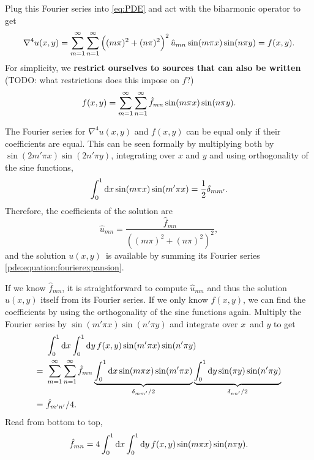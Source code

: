 Plug this Fourier series into \cref{eq:PDE} and act with the biharmonic operator to get
\begin{equation*}
\nabla^4 u(x,y) = \sum_{m=1}^{\infty} \sum_{n=1}^{\infty} \left((m\pi)^2+(n\pi)^2\right)^2 \hat{u}_{mn} \sin(m \pi x) \sin(n \pi y) = f(x,y).
\end{equation*}
For simplicity, we \textbf{restrict ourselves to sources that can also be written} (TODO: what restrictions does this impose on $f$?)
\begin{equation}
	f(x,y) = \sum_{m=1}^{\infty} \sum_{n=1}^{\infty} \hat{f}_{mn} \sin(m \pi x) \sin(n \pi y).
\end{equation}

The Fourier series for $\nabla^4 u(x,y)$ and $f(x,y)$ can be equal only if their coefficients are equal.
This can be seen formally by multiplying both by $\sin(2m'\pi x) \sin(2n'\pi y)$, integrating over $x$ and $y$ and using orthogonality of the sine functions,
\begin{equation*}
	\integral{\sin(m\pi x) \sin(m' \pi x)}{x}{0}{1} = \frac{1}{2} \delta_{mm'}.
\end{equation*}
Therefore, the coefficients of the solution are
\begin{equation}
	\hat{u}_{mn} = \frac{\hat{f}_{mn}}{\left((m\pi)^2+(n\pi)^2\right)^2},
\end{equation}
and the solution $u(x,y)$ is available by summing its Fourier series \ref{pde:equation:fourierexpansion}.

If we know $\hat{f}_{mn}$, it is straightforward to compute $\hat{u}_{mn}$ and thus the solution $u(x,y)$ itself from its Fourier series.
If we only know $f(x,y)$, we can find the coefficients by using the orthogonality of the sine functions again.
Multiply the Fourier series by $\sin(m' \pi x) \sin(n' \pi y)$ and integrate over $x$ and $y$ to get
\begin{equation*}
\begin{split}
  & \,\, \integraltwo{f(x,y) \sin(m' \pi x) \sin(n' \pi y)}{x}{y}{0}{1}{0}{1} \\
= & \,\, \sum_{m=1}^{\infty} \sum_{n=1}^{\infty} \hat{f}_{mn} \underbrace{\integral{\sin(m\pi x)\sin(m'\pi x)}{x}{0}{1}}_{\delta_{mm'}/2} \underbrace{\integral{\sin(\pi y)\sin(n'\pi y)}{y}{0}{1}}_{\delta_{nn'}/2} \\
= & \,\, \hat{f}_{m'n'} / 4.
\end{split}
\end{equation*}
Read from bottom to top,
\begin{equation}
\hat{f}_{mn} = 4 \integraltwo{f(x,y) \sin(m \pi x) \sin(n \pi y)}{x}{y}{0}{1}{0}{1}.
\end{equation}


